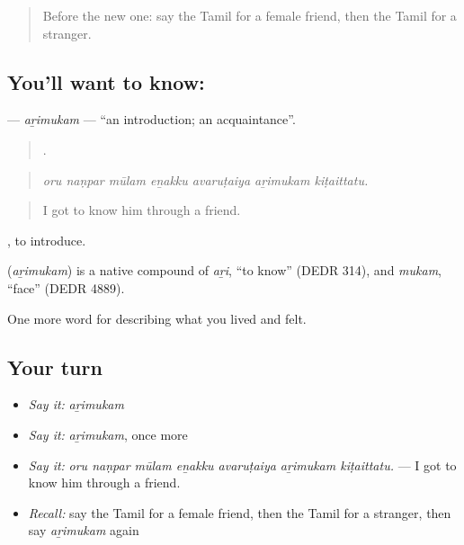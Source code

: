 \label{lesson:TA-C503-arimukam}



\begin{quote}
Before the new one: say the Tamil for a female friend, then the Tamil for a stranger.
\end{quote}

\subsection*{You'll want to know: }
\textbf{} — \emph{aṟimukam} — \textquotedblleft{}an introduction; an acquaintance\textquotedblright{}.

\begin{quote}
      .
\end{quote}

\begin{quote}
\emph{oru naṇpar mūlam eṉakku avaruṭaiya aṟimukam kiṭaittatu.}
\end{quote}

\begin{quote}
I got to know him through a friend.
\end{quote}

 , to introduce.

\begin{cousinweb}
\textbf{} (\emph{aṟimukam}) is a native compound of  \emph{aṟi}, \textquotedblleft{}to know\textquotedblright{} (DEDR 314), and  \emph{mukam}, \textquotedblleft{}face\textquotedblright{} (DEDR 4889).
\end{cousinweb}

\begin{grammarlens}[title={What you've built}]
One more word for describing what you lived and felt.
\end{grammarlens}

\subsection*{Your turn}
\begin{itemize}
\raggedright
  \item \emph{Say it:} \emph{aṟimukam}
  \item \emph{Say it:} \emph{aṟimukam}, once more
  \item \emph{Say it:} \emph{oru naṇpar mūlam eṉakku avaruṭaiya aṟimukam kiṭaittatu.} — I got to know him through a friend.
  \item \emph{Recall:} say the Tamil for a female friend, then the Tamil for a stranger, then say \emph{aṟimukam} again
\end{itemize}

